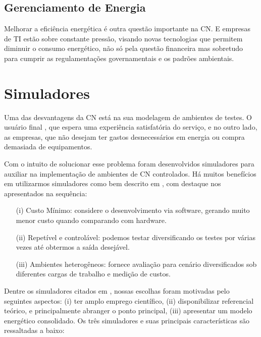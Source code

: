 \documentclass[tcc,capa]{texufpel}
\begin{document}
\subsection{Gerenciamento de Energia}

Melhorar a eficiência energética é outra questão importante na CN. E empresas de TI estão sobre constante pressão, visando novas tecnologias que permitem diminuir o consumo energético, não só pela questão financeira mas sobretudo para cumprir as regulamentações governamentais e os padrões ambientais.

\section{Simuladores}

Uma das desvantagens da CN está na sua modelagem de ambientes de testes. O usuário final , que espera uma experiência satisfatória do serviço, e no outro lado, as empresas, que não desejam ter gastos desnecessários em energia ou compra demasiada de equipamentos.

Com o intuito de solucionar esse problema foram desenvolvidos simuladores para auxiliar na implementação de ambientes de CN controlados. Há muitos benefícios em utilizarmos simuladores como bem descrito em \cite{ahmed2014cloud}, com destaque nos apresentados na sequência:

\begin{itemize}
    \item[(i)] Custo Mínimo: considere o desenvolvimento via software, gerando muito menor custo quando comparando com hardware.
    \item[(ii)] Repetível e controlável: podemos testar diversificando os testes por várias vezes até obtermos a saída desejável.
    \item[(iii)] Ambientes heterogêneos: fornece avaliação para cenário diversificados sob diferentes cargas de trabalho e medição de custos.
\end{itemize}

Dentre os simuladores citados em \cite{ahmed2014cloud}, nossas escolhas foram motivadas pelo seguintes aspectos: (i) ter amplo emprego científico, (ii) disponibilizar referencial teórico, e principalmente abranger o ponto principal, (iii) apresentar um modelo energético consolidado. 
Os três simuladores e suas principais características são ressaltadas a baixo:
\end{document}
